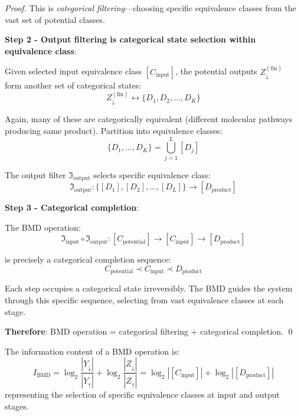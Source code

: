 \begin{proof}
This is \textit{categorical filtering}—choosing specific equivalence classes from the vast set of potential classes.

\textbf{Step 2 - Output filtering is categorical state selection within equivalence class}:

Given selected input equivalence class $[C_{\text{input}}]$, the potential outputs $Z_{\downarrow}^{(\text{fin})}$ form another set of categorical states:
\begin{equation}
Z_{\downarrow}^{(\text{fin})} \leftrightarrow \{D_1, D_2, \ldots, D_K\}
\end{equation}

Again, many of these are categorically equivalent (different molecular pathways producing same product). Partition into equivalence classes:
\begin{equation}
\{D_1, \ldots, D_K\} = \bigcup_{j=1}^L [D_j]
\end{equation}

The output filter $\Im_{\text{output}}$ selects specific equivalence class:
\begin{equation}
\Im_{\text{output}}: \{[D_1], [D_2], \ldots, [D_L]\} \to [D_{\text{product}}]
\end{equation}

\textbf{Step 3 - Categorical completion}:

The BMD operation:
\begin{equation}
\Im_{\text{input}} \circ \Im_{\text{output}}: [C_{\text{potential}}] \to [C_{\text{input}}] \to [D_{\text{product}}]
\end{equation}

is precisely a categorical completion sequence:
\begin{equation}
C_{\text{potential}} \prec C_{\text{input}} \prec D_{\text{product}}
\end{equation}

Each step occupies a categorical state irreversibly. The BMD guides the system through this specific sequence, selecting from vast equivalence classes at each stage.

\textbf{Therefore}: BMD operation = categorical filtering + categorical completion. \qed
\end{proof}

\begin{corollary}
\label{cor:bmd_information}
The information content of a BMD operation is:
\begin{equation}
I_{\text{BMD}} = \log_2 \frac{|Y_{\downarrow}|}{|Y_{\uparrow}|} + \log_2 \frac{|Z_{\downarrow}|}{|Z_{\uparrow}|} = \log_2 |[C_{\text{input}}]| + \log_2 |[D_{\text{product}}]|
\end{equation}
representing the selection of specific equivalence classes at input and output stages.
\end{corollary}

